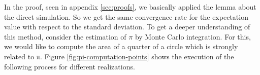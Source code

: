 \documentclass{stdlocal}
\begin{document}
    In the proof, seen in appendix \ref{sec:proofs}, we basically applied the lemma about the direct simulation.
    So we get the same convergence rate for the expectation value with respect to the standard deviation.
    To get a deeper understanding of this method, consider the estimation of $π$ by Monte Carlo integration.
    For this, we would like to compute the area of a quarter of a circle which is strongly related to π.
    Figure \ref{fig:pi-computation-points} shows the execution of the following process for different realizations.
\end{document}
